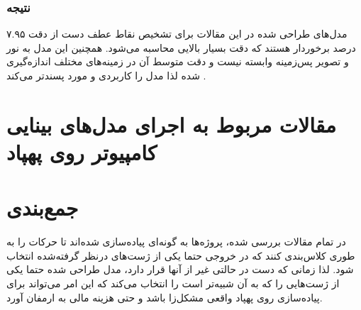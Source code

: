 \subsubsection{نتیجه}
مدل‌های طراحی شده در این مقالات برای تشخیص نقاط عطف دست از دقت ۷.۹۵ درصد برخوردار هستند که دقت بسیار بالایی محاسبه می‌شود. همچنین این مدل به نور و تصویر پس‌زمینه وابسته نیست و دقت متوسط آن در زمینه‌های مختلف اندازه‌گیری شده لذا مدل را کاربردی‌ و مورد پسندتر می‌کند\cite{zhang2020mediapipe} \cite{harris2021applying}.



\section{مقالات مربوط به اجرای مدل‌های بینایی کامپیوتر روی پهپاد}


\section{جمع‌بندی}


در تمام مقالات بررسی شده، پروژه‌ها به گونه‌ای پیاده‌سازی شده‌اند تا حرکات را به طوری کلاس‌بندی کنند که در خروجی حتما یکی از ژست‌های درنظر گرفته‌شده انتخاب شود. لذا زمانی که دست در حالتی غیر از آنها قرار دارد، مدل طراحی شده حتما یکی از ژست‌هایی را که به آن شبیه‌تر است را انتخاب می‌کند که این امر می‌تواند برای پیاده‌سازی روی پهپاد واقعی مشکل‌زا باشد و حتی هزینه مالی به ارمفان آورد.
